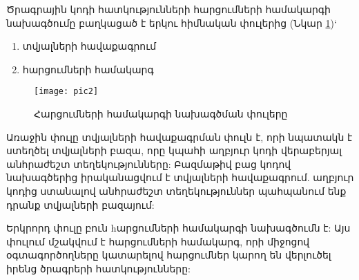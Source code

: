     {
        Ծրագրային կոդի հատկությունների հարցումների համակարգի նախագծումը բաղկացած է երկու հիմնական փուլերից (Նկար \ref{fig:figure2})`
        \begin{enumerate}
            \item տվյալների հավաքագրում
            \item հարցումների համակարգ
        \end{enumerate}
        \begin{figure}[h]
                \centering
                \texttt{[image: pic2]}
                \caption{Հարցումների համակարգի նախագծման փուլերը}
                \label{fig:figure2}
        \end{figure}

        Առաջին փուլը տվյալների հավաքագրման փուլն է, որի նպատակն է ստեղծել տվյալների բազա, որը կպահի աղբյուր կոդի
        վերաբերյալ անհրաժեշտ տեղեկությունները:
        Բազմաթիվ բաց կոդով նախագծերից իրականացվում է տվյալների հավաքագրում.
        աղբյուր կոդից ստանալով անհրաժեշտ տեղեկություններ պահպանում ենք դրանք տվյալների բազայում:

        Երկրորդ փուլը բուն hարցումների համակարգի նախագծումն է: Այս փուլում մշակվում է հարցումների համակարգ, որի միջոցով
        օգտագործողները կատարելով հարցումներ կարող են վերլուծել իրենց ծրագրերի հատկությունները:

        

        
    }
